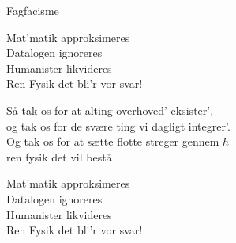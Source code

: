 \begin{song}{Fagfacisme}
  \begin{SBChorus}
    Mat'matik approksimeres\\
    Datalogen ignoreres\\
    Humanister likvideres\\
    Ren Fysik det bli'r vor svar!
  \end{SBChorus}

  \begin{SBVerse}
    Så tak os for at alting overhoved' eksister',\\
    og tak os for de svære ting vi dagligt integrer'.\\
    Og tak os for at sætte flotte streger gennem $h$\\
    ren fysik det vil bestå
  \end{SBVerse}

  \begin{SBChorus}
    Mat'matik approksimeres\\
    Datalogen ignoreres\\
    Humanister likvideres\\
    Ren Fysik det bli'r vor svar!
  \end{SBChorus}

  \begin{SBSection*}
  \end{SBSection*}
\end{song}